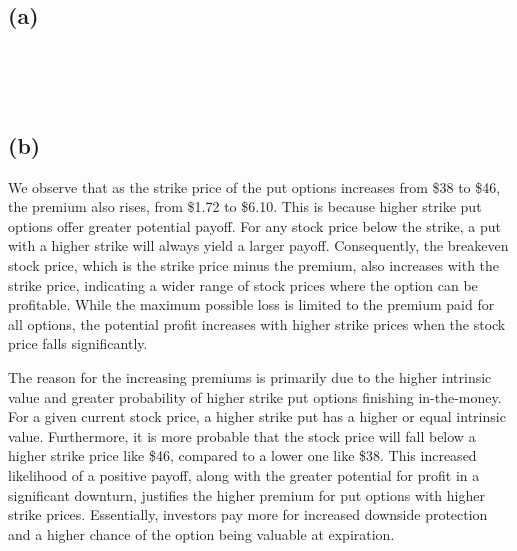     \subsection{(a)}\label{a}

    \begin{center}
    \end{center}
    { \hspace*{\fill} \\}
    
    \begin{center}
    \end{center}
    { \hspace*{\fill} \\}
    
    \subsection{(b)}\label{b}

We observe that as the strike price of the put options increases from
\$38 to \$46, the premium also rises, from \$1.72 to \$6.10. This is
because higher strike put options offer greater potential payoff. For
any stock price below the strike, a put with a higher strike will always
yield a larger payoff. Consequently, the breakeven stock price, which is
the strike price minus the premium, also increases with the strike
price, indicating a wider range of stock prices where the option can be
profitable. While the maximum possible loss is limited to the premium
paid for all options, the potential profit increases with higher strike
prices when the stock price falls significantly.

The reason for the increasing premiums is primarily due to the higher
intrinsic value and greater probability of higher strike put options
finishing in-the-money. For a given current stock price, a higher strike
put has a higher or equal intrinsic value. Furthermore, it is more
probable that the stock price will fall below a higher strike price like
\$46, compared to a lower one like \$38. This increased likelihood of a
positive payoff, along with the greater potential for profit in a
significant downturn, justifies the higher premium for put options with
higher strike prices. Essentially, investors pay more for increased
downside protection and a higher chance of the option being valuable at
expiration.

